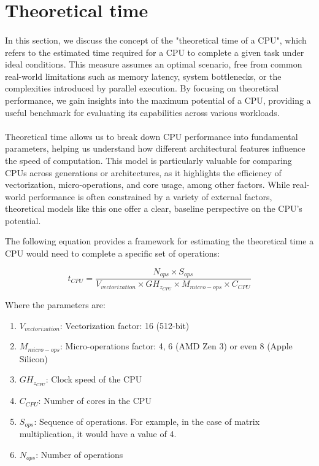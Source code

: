 \section{Theoretical time}

    \paragraph*{}
    In this section, we discuss the concept of the "theoretical time of a CPU", which refers to the 
    estimated time required for a CPU to complete a given task under ideal conditions. This measure 
    assumes an optimal scenario, free from common real-world limitations such as memory latency, 
    system bottlenecks, or the complexities introduced by parallel execution. By focusing on theoretical 
    performance, we gain insights into the maximum potential of a CPU, providing a useful benchmark 
    for evaluating its capabilities across various workloads.
    \par

    \paragraph*{}
    Theoretical time allows us to break down CPU performance into fundamental parameters, helping us 
    understand how different architectural features influence the speed of computation. This model is 
    particularly valuable for comparing CPUs across generations or architectures, as it highlights 
    the efficiency of vectorization, micro-operations, and core usage, among other factors. While 
    real-world performance is often constrained by a variety of external factors, theoretical models 
    like this one offer a clear, baseline perspective on the CPU's potential.
    \par

    The following equation provides a framework for estimating the theoretical time a CPU would need 
    to complete a specific set of operations:

    \begin{equation}
        t_{CPU}=\frac{N_{ops} \times S_{ops}}{V_{vectorization} \times GH_{z_{CPU}} \times M_{micro-ops} \times C_{CPU}}
        \label{eq:timetheoretical}
    \end{equation}


    Where the parameters are: 
    \begin{enumerate}
        \item \(V_{vectorization}\): Vectorization factor: 16 (512-bit)
        \item \(M_{micro-ops}\): Micro-operations factor: 4, 6 (AMD Zen 3) or even 8 (Apple Silicon)
        \item \(GH_{z_{CPU}}\): Clock speed of the CPU
        \item \(C_{CPU}\): Number of cores in the CPU
        \item \(S_{ops}\): Sequence of operations. For example, in the case of matrix multiplication, it would have a value of 4.
        \item \(N_{ops}\): Number of operations
    \end{enumerate}

\newpage